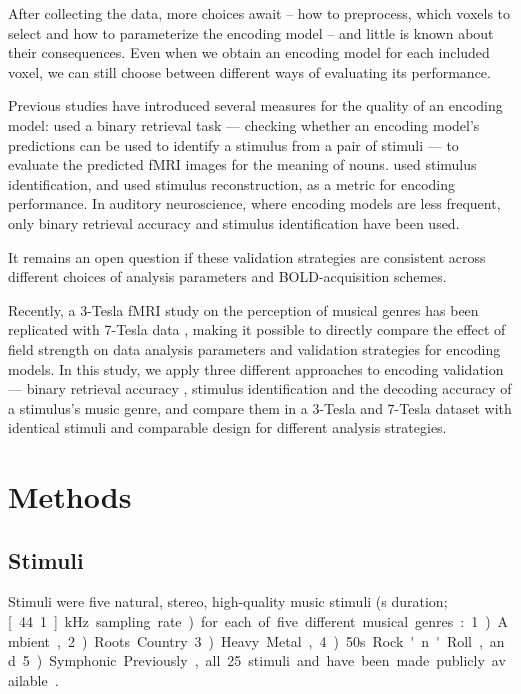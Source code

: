 After collecting the data, more choices await -- how to preprocess, which
voxels to select and how to parameterize the encoding model -- and little is known about their
consequences. Even when we obtain an encoding model for each included voxel,
we can still choose between different ways of evaluating its performance.

Previous studies have introduced several measures for the quality of
an encoding model: \citet{ML08} used a binary retrieval task --- checking
whether an encoding model's predictions can be used to identify a stimulus from
a pair of stimuli --- to evaluate the predicted f{MRI} images for the meaning
of nouns. \citet{KG+08} used stimulus identification, and \citet{NG09} used
stimulus reconstruction, as a metric for encoding performance. In auditory
neuroscience, where encoding models are less frequent, only binary retrieval
accuracy \citep{CTK+2012} and stimulus identification \citep{SF14} have been
used. 

It remains an open question if these validation strategies are consistent
across different choices of analysis parameters and BOLD-acquisition schemes.

Recently, a 3-Tesla f{MRI} study on the perception of musical genres
\citep{CTK+2012} has been replicated with 7-Tesla data \citep{HDH+2015}, making
it possible to directly compare the effect of field strength on data analysis
parameters and validation strategies for encoding models. In this study, we
apply three different approaches to encoding validation --- binary retrieval
accuracy \citep{ML08}, stimulus identification \citep{KG+08,SF14} and the
decoding accuracy of a stimulus's music genre, and compare them in a 3-Tesla
and 7-Tesla dataset with identical stimuli and comparable design for different
analysis strategies.

\section*{Methods}

\subsection*{Stimuli}

Stimuli were five natural, stereo, high-quality music stimuli (\unit[6]{s}
duration; \unit[44.1]{kHz} sampling rate) for each of five different musical
genres: 1) Ambient, 2) Roots Country 3) Heavy Metal, 4) 50s Rock'n'Roll, and 5)
Symphonic. Previously, all 25 stimuli and have been made publicly available
\citep{HDH+2015}.

